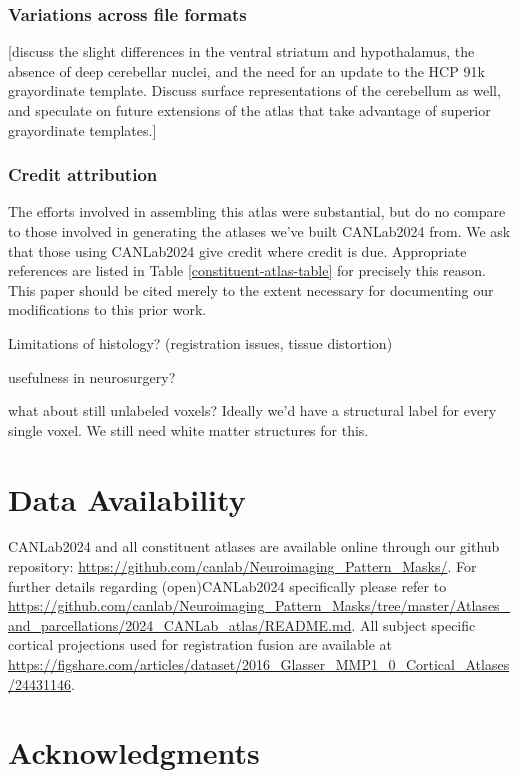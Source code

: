 \documentclass[10pt,letterpaper]{article}
\begin{document}
\subsubsection{Variations across file formats}
[discuss the slight differences in the ventral striatum and hypothalamus, the absence of deep cerebellar nuclei, and the need for an update to the HCP 91k grayordinate template. Discuss surface representations of the cerebellum as well, and speculate on future extensions of the atlas that take advantage of superior grayordinate templates.]

\subsubsection{Credit attribution}
The efforts involved in assembling this atlas were substantial, but do no compare to those involved in generating the atlases we've built CANLab2024 from. We ask that those using CANLab2024 give credit where credit is due. Appropriate references are listed in Table \ref{constituent-atlas-table} for precisely this reason. This paper should be cited merely to the extent necessary for documenting our modifications to this prior work.


Limitations of histology? (registration issues, tissue distortion)

usefulness in neurosurgery?

what about still unlabeled voxels? Ideally we'd have a structural label for every single voxel. We still need white matter structures for this.


\section{Data Availability}
CANLab2024 and all constituent atlases are available online through our github repository: \url{https://github.com/canlab/Neuroimaging_Pattern_Masks/}. For further details regarding (open)CANLab2024 specifically please refer to \url{https://github.com/canlab/Neuroimaging_Pattern_Masks/tree/master/Atlases_and_parcellations/2024_CANLab_atlas/README.md}. All subject specific cortical projections used for registration fusion are available at \url{https://figshare.com/articles/dataset/2016_Glasser_MMP1_0_Cortical_Atlases/24431146}. 

\section{Acknowledgments}
\end{document}
